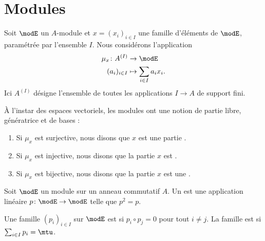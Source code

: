\section{Modules}

Soit \( \modE\) un \( A\)-module et \( x=(x_i)_{i\in I}\) une famille d'éléments de \( \modE\), paramétrée par l'ensemble \( I\). Nous considérons l'application
\begin{equation}
    \begin{aligned}
        \mu_x\colon A^{(I)}&\to \modE \\
        (a_i)_{i\in I}&\mapsto \sum_{i\in I}a_ix_i.
    \end{aligned}
\end{equation}
Ici \( A^{(I)}\) désigne l'ensemble de toutes les applications \( I\to A\) de support fini.  

\begin{definition}      \label{DefBasePouyKj}
    À l'instar des espaces vectoriels, les modules ont une notion de partie libre, génératrice et de bases :
    \begin{enumerate}
        \item
            Si \( \mu_x\) est surjective, nous disons que \( x\) est une partie .
        \item
            Si \( \mu_x\) est injective, nous disons que la partie \( x\) est .
        \item
            Si \( \mu_x\) est bijective, nous disons que la partie \( x\) est une .
    \end{enumerate}
\end{definition}

\begin{definition}
    Soit \( \modE\) un module sur un anneau commutatif \( A\). Un  est une application linéaire \( p\colon \modE\to \modE\) telle que \( p^2=p\).

    Une famille \( (p_i)_{i\in I}\) sur \( \modE\) est  si \( p_i\circ p_j=0\) pour tout \( i\neq j\). La famille est  si \( \sum_{i\in I}p_i=\mtu\).
\end{definition}


